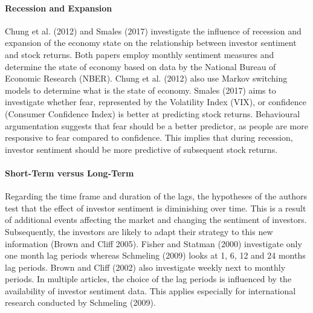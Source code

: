 \paragraph{Recession and Expansion}
Chung et al. (2012) and Smales (2017) investigate the influence of recession and expansion of the economy state on the relationship between investor sentiment and stock returns. Both papers employ monthly sentiment measures and determine the state of economy based on data by the National Bureau of Economic Research (NBER). Chung et al. (2012) also use Markov switching models to determine what is the state of economy. Smales (2017) aims to investigate whether fear, represented by the Volatility Index (VIX), or confidence (Consumer Confidence Index) is better at predicting stock returns. Behavioural argumentation suggests that fear should be a better predictor, as people are more responsive to fear compared to confidence. This implies that during recession, investor sentiment should be more predictive of subsequent stock returns. 

\paragraph{Short-Term versus Long-Term}
Regarding the time frame and duration of the lags, the hypotheses of the authors test that the effect of investor sentiment is diminishing over time. This is a result of additional events affecting the market and changing the sentiment of investors. Subsequently, the investors are likely to adapt their strategy to this new information (Brown and Cliff 2005). Fisher and Statman (2000) investigate only one month lag periods whereas Schmeling (2009) looks at 1, 6, 12 and 24 months lag periods. Brown and Cliff (2002) also investigate weekly next to monthly periods. In multiple articles, the choice of the lag periods is influenced by the availability of investor sentiment data. This applies especially for international research conducted by Schmeling (2009). 

